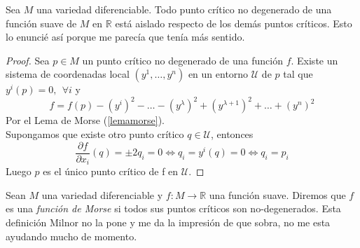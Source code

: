\begin{corollary}
        Sea $M$ una variedad diferenciable. Todo punto crítico no degenerado de una función suave de $M$ en $\mathbb{R}$ está aislado respecto de los demás puntos críticos. {\color{blue} Esto lo enuncié así porque me parecía que tenía más sentido.}
\end{corollary}
\begin{proof}
    Sea $p\in M$ un punto crítico no degenerado de una función $f$. Existe un sistema de coordenadas local $(y^1,\dots, y^n)$ en un entorno $\mathcal{U}$ de $p$ tal que $y^i(p)=0,~~\forall i$ y 
    \begin{equation*}
        f=f(p)-(y^i)^2-\dots-(y^\lambda)^2 + (y^{\lambda +1})^2+\dots + (y^n)^2
    \end{equation*}
    Por el Lema de Morse (\ref{lemamorse}).\\

    Supongamos que existe otro punto crítico $q\in\mathcal{U}$, entonces
    \begin{equation*}
        \frac{\partial f}{\partial x_i}(q)=\pm 2q_i= 0\iff q_i= y^i(q)=0\iff q_i=p_i
    \end{equation*}
    Luego $p$ es el único punto crítico de f en $\mathcal{U}$.
    
\end{proof}

\begin{definition}
    Sean $M$ una variedad diferenciable y $f:M\to \mathbb{R}$ una función suave. Diremos que $f$ es una \textit{función de Morse} si todos sus puntos críticos son no-degenerados. {\color{blue} Esta definición Milnor no la pone y me da la impresión de que sobra, no me esta ayudando mucho de momento.}
\end{definition}